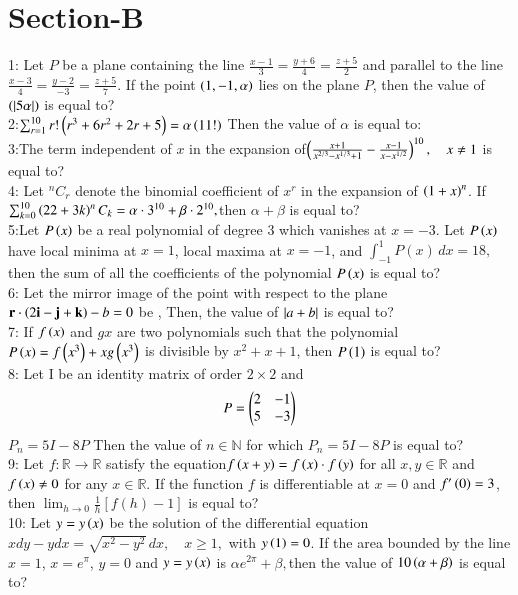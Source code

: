\documentclass[journal,12pt,twocolumn]{IEEEtran}
\theoremstyle{remark}
\begin{document}
\section{Section-B}
1: Let $ P $ be a plane containing the line 
$\frac{x - 1}{3} = \frac{y + 6}{4} = \frac{z + 5}{2}$
and parallel to the line $\frac{x - 3}{4} = \frac{y - 2}{-3} = \frac{z + 5}{7}.$ If the point $\left(1, -1, \alpha\right)$ lies on the plane $P$, then the value of $\left(\left\vert5\alpha\right\vert\right)$ is equal to?\vspace{1mm}\\
2:$ \sum_{r=1}^{10} r! \left(r^3 + 6r^2 + 2r + 5\right) = \alpha\left(11!\right)$
Then the value of $\alpha$ is equal to:\vspace{1mm}\\
3:The term independent of $x$ in the expansion of$\left(\frac{x + 1}{x^{2/3} - x^{1/3} + 1} - \frac{x - 1}{x - x^{1/2}}\right)^{10}, \quad x \neq 1$ is equal to?\vspace{1mm} \\ 
4:  Let $^nC_r$ denote the binomial coefficient of $x^r$ in the expansion of $\left(1 + x\right)^n$. If $\sum_{k=0}^{10} \left(22 + 3k\right)   ^nC_k = \alpha \cdot 3^{10} + \beta \cdot 2^{10},$then $\alpha + \beta$ is equal to?\vspace{1mm}\\
5:Let $P\left(x\right)$ be a real polynomial of degree 3 which vanishes at $x = -3$. Let $P\left(x\right)$ have local minima at $x = 1$, local maxima at $x = -1$, and $\int_{-1}^{1} P(x) \, dx = 18,$then the sum of all the coefficients of the polynomial $P\left(x\right)$ is equal to?\vspace{1mm}\\
6: Let the mirror image of the point  with respect to the plane $\mathbf{r} \cdot \left(2\mathbf{i} - \mathbf{j} + \mathbf{k}\right) - b = 0$ be , Then, the value of $\left\vert a + b\right\vert$ is equal to?\vspace{1mm}\\
7: If $f\left(x\right)$ and $g{x}$ are two polynomials such that the polynomial $P\left(x\right) = f\left(x^3\right) + x g\left(x^3\right)$ is divisible by $x^2 + x + 1$, then $P\left(1\right)$ is equal to?\vspace{1mm}\\
8: Let I be an identity matrix of order $2 \times 2$ and $$P = \begin{pmatrix}2&-1\\5&-3\end{pmatrix}$$ $P_n = 5I - 8P$ Then the value of $n \in \mathbb{N}$ for which $P_n = 5I - 8P$ is equal to?\vspace{1mm}\\
9: Let $f : \mathbb{R} \to \mathbb{R}$ satisfy the equation$f\left(x + y\right) = f\left(x\right) \cdot f\left(y\right)$ for all $x, y \in \mathbb{R}$ and $f\left(x\right) \neq 0$ for any $x \in \mathbb{R}$. If the function $f$ is differentiable at $x = 0$ and $f'\left(0\right) = 3$, then $\lim_{h \to 0} \frac{1}{h} [f(h) - 1] $
is equal to?\vspace{1mm}\\
10: Let $y = y\left(x\right)$ be the solution of the differential equation 
$x dy - y dx = \sqrt{x^2 - y^2} \, dx, \quad x \geq 1,$ with $y\left(1\right) = 0$. If the area bounded by the line $x = 1$, $x = e^\pi$, $y = 0$ and $y = y\left(x\right)$ is $\alpha e^{2\pi} + \beta, $then the value of $10 \left(\alpha + \beta\right)$ is equal to?
\end{document}
